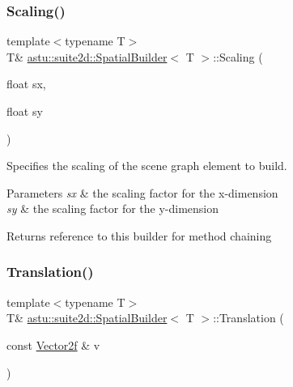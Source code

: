 \subsubsection{\texorpdfstring{Scaling()}{Scaling()}\hspace{0.1cm}{\footnotesize\ttfamily [3/3]}}
{\footnotesize\ttfamily template$<$typename T$>$ \\
T\& \hyperlink{classastu_1_1suite2d_1_1SpatialBuilder}{astu\+::suite2d\+::\+Spatial\+Builder}$<$ T $>$\+::Scaling (\begin{DoxyParamCaption}\item[{float}]{sx,  }\item[{float}]{sy }\end{DoxyParamCaption})\hspace{0.3cm}{\ttfamily [inline]}}

Specifies the scaling of the scene graph element to build.


\begin{DoxyParams}{Parameters}
{\em sx} & the scaling factor for the x-\/dimension \\
\hline
{\em sy} & the scaling factor for the y-\/dimension \\
\hline
\end{DoxyParams}
\begin{DoxyReturn}{Returns}
reference to this builder for method chaining 
\end{DoxyReturn}
\mbox{\label{classastu_1_1suite2d_1_1SpatialBuilder_a4a39f76b987baf04c79ef1232ca3df7e}} 
\subsubsection{\texorpdfstring{Translation()}{Translation()}\hspace{0.1cm}{\footnotesize\ttfamily [1/2]}}
{\footnotesize\ttfamily template$<$typename T$>$ \\
T\& \hyperlink{classastu_1_1suite2d_1_1SpatialBuilder}{astu\+::suite2d\+::\+Spatial\+Builder}$<$ T $>$\+::Translation (\begin{DoxyParamCaption}\item[{const \hyperlink{classastu_1_1Vector2}{Vector2f} \&}]{v }\end{DoxyParamCaption})\hspace{0.3cm}{\ttfamily [inline]}}

